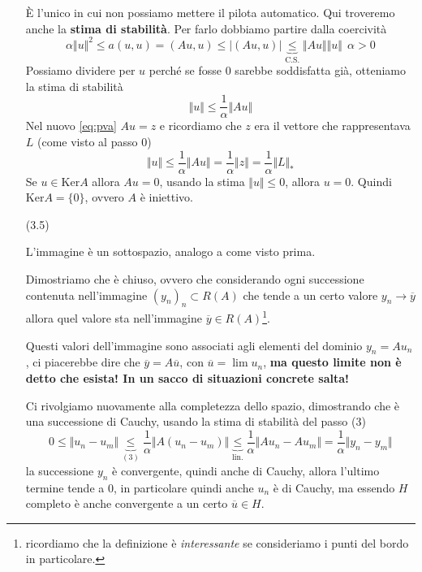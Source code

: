 \begin{dimostrazione}
\begin{itemize}
              È l'unico in cui non possiamo mettere il pilota automatico. Qui troveremo anche la \textbf{stima di stabilità}. Per farlo dobbiamo partire dalla coercività
              \begin{equation*}
                  \alpha \Vert u\Vert ^{2} \leq a(u,u) =(Au,u) \leq | (Au,u)| \underbrace{\leq }_{\text{C.S.}}\Vert Au\Vert \Vert u\Vert \ \ \alpha  >0
              \end{equation*}
              Possiamo dividere per $u$ perché se fosse $0$ sarebbe soddisfatta già, otteniamo la stima di stabilità
              \begin{equation*}
                  \Vert u\Vert \leq \frac{1}{\alpha }\Vert Au\Vert
              \end{equation*}
              Nel nuovo \eqref{eq:pva} $Au=z$ e ricordiamo che $z$ era il vettore che rappresentava $L$ (come visto al passo 0)
              \begin{equation*}
                  \Vert u\Vert \leq \frac{1}{\alpha }\Vert Au\Vert =\frac{1}{\alpha }\Vert z\Vert =\frac{1}{\alpha }\Vert L\Vert _{*}
              \end{equation*}
              Se $u\in \mathrm{Ker} A$ allora $Au=0$, usando la stima $\Vert u\Vert \leq 0$, allora $u=0$. Quindi $\mathrm{Ker} A=\{0\}$, ovvero $A$ è iniettivo.

        \item[(3.5)]

              L'immagine è un sottospazio, analogo a come visto prima.

              Dimostriamo che è chiuso, ovvero che considerando ogni successione contenuta nell'immagine $(y_{n})_{n} \subset R(A)$ che tende a un certo valore $y_{n}\rightarrow \overline{y}$ allora quel valore sta nell'immagine $\overline{y} \in R(A)$\footnote{ricordiamo che la definizione è \textit{interessante} se consideriamo i punti del bordo in particolare.}.

              Questi valori dell'immagine sono associati agli elementi del dominio $y_{n} =Au_{n}$, ci piacerebbe dire che $\overline{y} =A\overline{u}$, con $\overline{u} =\lim u_{n}$, \textbf{ma questo limite non è detto che esista! In un sacco di situazioni concrete salta!}

              Ci rivolgiamo nuovamente alla completezza dello spazio, dimostrando che è una successione di Cauchy, usando la stima di stabilità del passo (3)
              \begin{equation*}
                  0\leq \Vert u_{n} -u_{m}\Vert \underbrace{\leq }_{(3)}\frac{1}{\alpha }\Vert A(u_{n} -u_{m})\Vert \underbrace{\leq }_{\text{lin.}}\frac{1}{\alpha }\Vert Au_{n} -Au_{m}\Vert =\frac{1}{\alpha }\Vert y_{n} -y_{m}\Vert
              \end{equation*}
              la successione $y_{n}$ è convergente, quindi anche di Cauchy, allora l'ultimo termine tende a $0$, in particolare quindi anche $u_{n}$ è di Cauchy, ma essendo $H$ completo è anche convergente a un certo $\overline{u} \in H$.


\end{itemize}
\end{dimostrazione}
